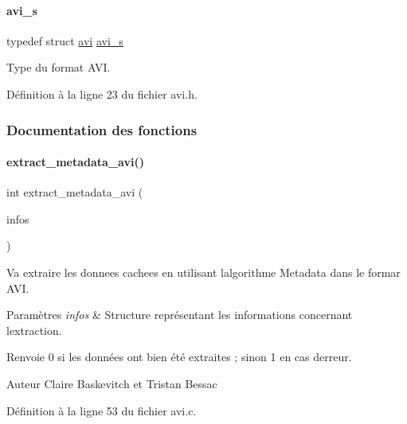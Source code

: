 \paragraph{\texorpdfstring{avi\+\_\+s}{avi\_s}}
{\footnotesize\ttfamily typedef struct \hyperlink{a00158}{avi} \hyperlink{a00071_a1c6fab5211eb03b7a7a0243c341b7882}{avi\+\_\+s}}

Type du format A\+VI. 

Définition à la ligne 23 du fichier avi.\+h.



\subsubsection{Documentation des fonctions}
\mbox{\label{a00071_aa0a2b469d42533228d073a79868e775b}} 
\paragraph{\texorpdfstring{extract\+\_\+metadata\+\_\+avi()}{extract\_metadata\_avi()}}
{\footnotesize\ttfamily int extract\+\_\+metadata\+\_\+avi (\begin{DoxyParamCaption}\item[{\hyperlink{a00008_aa8ca908d92fb5bdd3c0a9e1f58b2cf03}{info\+\_\+s} $\ast$}]{infos }\end{DoxyParamCaption})}



Va extraire les donnees cachees en utilisant l\textquotesingle{}algorithme Metadata dans le formar A\+VI. 


\begin{DoxyParams}{Paramètres}
{\em infos} & Structure représentant les informations concernant l\textquotesingle{}extraction. \\
\hline
\end{DoxyParams}
\begin{DoxyReturn}{Renvoie}
0 si les données ont bien été extraites ; sinon 1 en cas d\textquotesingle{}erreur. 
\end{DoxyReturn}
\begin{DoxyAuthor}{Auteur}
Claire Baskevitch et Tristan Bessac 
\end{DoxyAuthor}


Définition à la ligne 53 du fichier avi.\+c.

